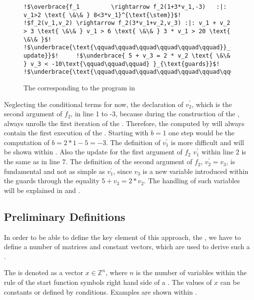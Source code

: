 \begin{figure}[H]	
	\begin{lstlisting}[linewidth=1.2\textwidth, escapechar = !]
!$\overbrace{f_1	     \rightarrow f_2(1+3*v_1,-3)   :|: v_1>2 \text{ \&\& } 8<3*v_1}^{\text{\stem}}$!
!$f_2(v_1,v_2) \rightarrow f_2(3*v_1+v_2,v_3) :|: v_1 + v_2 > 3 \text{ \&\& } v_1 > 6 \text{ \&\& } 3 * v_1 > 20 \text{ \&\& }$!
!$\underbrace{\text{\qquad\qquad\qquad\qquad\qquad\qquad}}_{\text{linear update}}$!		!$\underbrace{ 5 + v_3 = 2 * v_2 \text{ \&\& } v_3 < -10\text{\qquad\qquad\qquad} }_{\text{guards}}$!
!$\underbrace{\text{\qquad\qquad\qquad\qquad\qquad\qquad\qquad\qquad\qquad\qquad\qquad\qquad\qquad\qquad\qquad\qquad}}_{\text{\loopt}}$!
	\end{lstlisting}

	\caption{The \its corresponding to the  program in }
	\label{fig:structure-example-TRS}
\end{figure}
 Neglecting the conditional terms for now, the declaration of $v^\prime_2$, which is the second argument of $f_2$, in line 1 to -3, 
 because during the construction of the \seg, \aprove always unrolls the first iteration of the \loopt. Therefore, the \stem computed by \aprove will always contain the first execution of the \loopt. Starting with $b=1$ one step would be the computation of $b = 2*1-5=-3$. The definition of $v^\prime_1$ is more difficult and will be shown within .
Also the update for the first argument of $f_2$ $v^\prime_1$ within line 2 is the same as in  line 7. The definition of the second argument of $f_2$, $v^\prime_2 = v_3$, is fundamental and not as simple as $v^\prime_1$, since $v_3$ is a new variable introduced within the guards through the equality $5+v_3=2*v_2$. The handling of such variables will be explained in  and . \newline

\subsection{Preliminary Definitions}
In order to be able to define the key element of this approach, the \gna, we have to define a number of matrices and constant vectors, which are used to derive such a \gna. 

\begin{definition}[\stem]
	The \stem is denoted as a vector $x \in \mathbb{Z}^n$, where $n$ is the number of variables within the rule of the start function symbols right hand side of a \its. The values of $x$ can be constants or defined by conditions. Examples are shown within .
\end{definition}

